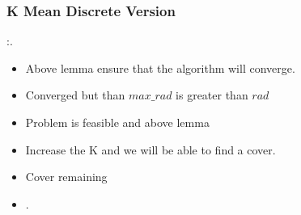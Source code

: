 \documentclass[blue]{beamer}
\begin{document}
\begin{frame}
 \frametitle{K Mean Discrete Version}
 {}:{\color{blue}{K Mean Discrete Version Algorithm finds the cover}}.
 \begin{itemize}
  \item Above lemma ensure that the algorithm will converge.
  \item Converged but than $max\_rad$ is greater than $rad$
  \item Problem is feasible and above lemma
  \item Increase the K and we will be able to find a cover.
  \item Cover remaining
  \item {\color{blue}{Hence we will be able to get the cover}}.
 \end{itemize}
\end{frame}
\end{document}

